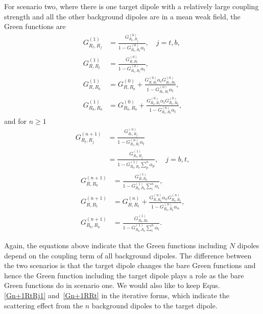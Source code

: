 


For scenario two, where there is one target dipole with a relatively large coupling strength and all the other background dipoles are in a mean weak field, the Green functions are
\begin{subequations}
\label{G1RR}
\begin{align}
 G^{(1)}_{R_t,R_j} &=\frac{G^{(0)}_{R_t,R_j}}{1-G^{(0)}_{R_t,R_t}\alpha_t},\quad j=t,b,\\
  G^{(1)}_{R,R_t} &=\frac{G^{(0)}_{R,R_t}}{1-G^{(0)}_{R_t,R_t}\alpha_t}, \\
  G^{(1)}_{R,R_b} &=G^{(0)}_{R,R_b}+\frac{G^{(0)}_{R,R_t}\alpha_t G^{(0)}_{R_t,R_b}}{1-G^{(0)}_{R_t,R_t}\alpha_t},\\
  G^{(1)}_{R_b,R_b} &=G^{(0)}_{R_b,R_b}+\frac{G^{(0)}_{R_b,R_t}\alpha_t G^{(0)}_{R_t,R_b}}{1-G^{(0)}_{R_t,R_t}\alpha_t},\label{G1RbRb}
\end{align}
\end{subequations}
and for $n\geq 1$
\begin{subequations}
\label{Gn+1RtRj}
\begin{align}
 G^{(n+1)}_{R_t,R_j} &=\frac{G^{(n)}_{R_t,R_j}}{1-G^{(n)}_{R_t,R_t}\alpha_t} \label{Gn+1RtRj1}\\
&= \frac{G^{(1)}_{R_t,R_j}}{1-G^{(1)}_{R_b,R_b}\sum_p^n{\alpha_p}},\quad j=b,t,\label{Gn+1RtRjexpand}
\end{align}
\end{subequations}
\begin{align}
  G^{(n+1)}_{R,R_b} &=\frac{G^{(1)}_{R,R_b}}{1-G^{(1)}_{R_b,R_b}\sum_i^n{\alpha_i}},\\
 G^{(n+1)}_{R,R_t} &=G^{(n)}_{R,R_t}+\frac{G^{(n)}_{R,R_b}\alpha_n G^{(n)}_{R_b,R_t}}{1-G^{(n)}_{R_b,R_b}\alpha_n}, \label{Gn+1RRt}\\
  G^{(n+1)}_{R_b,R_b} &=\frac{G^{(1)}_{R_b,R_b}}{1-G^{(1)}_{R_b,R_b}\sum_i^n{\alpha_i}}.\label{Gn+1RbRb}
\end{align}

Again, the equations above indicate that the Green functions including $N$ dipoles depend on the coupling term of all background dipoles. The difference between the two scenarios is that the target dipole changes the bare Green functions and hence the Green function including the target dipole plays a role as the bare Green functions do in scenario one. We would also like to keep Equs.\eqref{Gn+1RtRj1} and~\eqref{Gn+1RRt} in the iterative forms, which indicate the scattering effect from the $n$ background dipoles to the target dipole.

